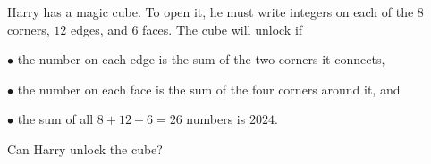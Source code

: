 Harry has a magic cube. To open it, he must write integers on each of the $8$ corners, $12$ edges, and $6$ faces. The cube will unlock if

$\bullet$  the number on each edge is the sum of the two corners it connects,

$\bullet$  the number on each face is the sum of the four corners around it, and

$\bullet$  the sum of all $8+12+6 = 26$ numbers is $2024$.

Can Harry unlock the cube?
